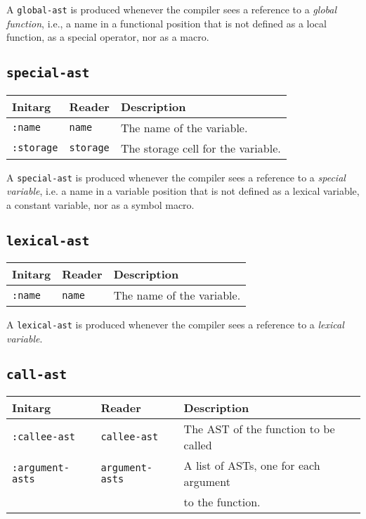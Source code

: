 A \texttt{global-ast} is produced whenever the compiler sees a
reference to a \emph{global function}, i.e., a name in a functional
position that is not defined as a local function, as a special
operator, nor as a macro.

\subsection{\texttt{special-ast}}

\begin{tabular}{|l|l|l|}
\hline
Initarg & Reader & Description\\
\hline\hline
\texttt{:name} & \texttt{name} & The name of the variable.\\  
\hline
\texttt{:storage} & \texttt{storage} & The storage cell for the variable.\\
\hline
\end{tabular}

A \texttt{special-ast} is produced whenever the compiler sees a
reference to a \emph{special variable}, i.e. a name in a variable
position that is not defined as a lexical variable, a constant
variable, nor as a symbol macro.

\subsection{\texttt{lexical-ast}}

\begin{tabular}{|l|l|l|}
\hline
Initarg & Reader & Description\\
\hline\hline
\texttt{:name} & \texttt{name} & The name of the variable.\\  
\hline
\end{tabular}

A \texttt{lexical-ast} is produced whenever the compiler sees a
reference to a \emph{lexical variable}. 

\subsection{\texttt{call-ast}}

\begin{tabular}{|l|l|l|}
\hline
Initarg & Reader & Description\\
\hline\hline
\texttt{:callee-ast} & \texttt{callee-ast} & The AST of the function
to be called\\  
\hline
\texttt{:argument-asts} & \texttt{argument-asts} & A list of ASTs, one
for each argument\\
& & to the function.\\
\hline
\end{tabular}

